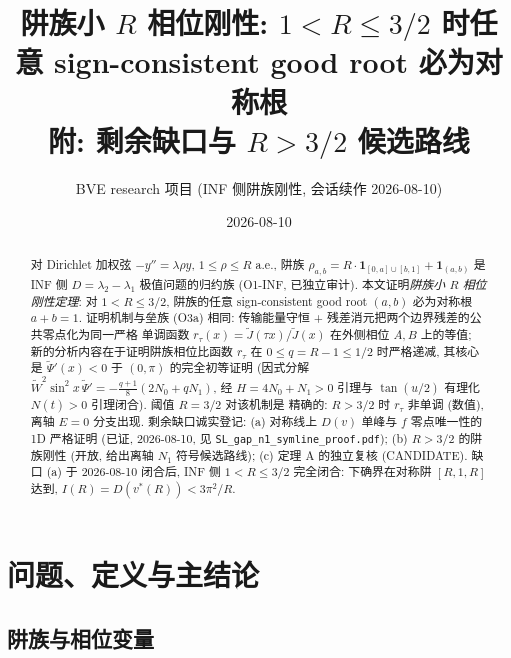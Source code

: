 \documentclass[UTF8]{ctexart}
\title{阱族小 $R$ 相位刚性: $1<R\le 3/2$ 时任意 sign-consistent good root 必为对称根\\
\large 附: 剩余缺口与 $R>3/2$ 候选路线}
\author{BVE research 项目 (INF 侧阱族刚性, 会话续作 2026-08-10)}
\date{2026-08-10}
\begin{document}
\maketitle

\begin{abstract}
对 Dirichlet 加权弦 $-y''=\lambda\rho y$, $1\le\rho\le R$ a.e., 阱族
$\rho_{a,b}=R\cdot\mathbf 1_{[0,a]\cup[b,1]}+\mathbf 1_{(a,b)}$ 是 INF 侧 $D=\lambda_2-\lambda_1$
极值问题的归约族 (O1-INF, 已独立审计). 本文证明\emph{阱族小 $R$ 相位刚性定理}:
对 $1<R\le 3/2$, 阱族的任意 sign-consistent good root $(a,b)$ 必为对称根 $a+b=1$.
证明机制与垒族 (O3a) 相同: 传输能量守恒 + 残差消元把两个边界残差的公共零点化为同一严格
单调函数 $r_{\tau}(x)=\widetilde J(\tau x)/\widetilde J(x)$ 在外侧相位 $A,B$ 上的等值;
新的分析内容在于证明阱族相位比函数 $r_{\tau}$ 在 $0\le q=R-1\le 1/2$ 时严格递减,
其核心是 $\widetilde\Psi'(x)<0$ 于 $(0,\pi)$ 的完全初等证明 (因式分解
$\widetilde W^2\sin^2x\,\widetilde\Psi'=-\frac{q+1}{8}(2N_0+qN_1)$,
经 $H=4N_0+N_1>0$ 引理与 $\tan(u/2)$ 有理化 $N(t)>0$ 引理闭合). 阈值 $R=3/2$ 对该机制是
精确的: $R>3/2$ 时 $r_{\tau}$ 非单调 (数值), 离轴 $E=0$ 分支出现. 剩余缺口诚实登记:
(a) 对称线上 $D(v)$ 单峰与 $f$ 零点唯一性的 1D 严格证明 (已证, 2026-08-10, 见 \texttt{SL\_gap\_n1\_symline\_proof.pdf}); (b) $R>3/2$ 的阱族刚性
(开放, 给出离轴 $N_1$ 符号候选路线); (c) 定理 A 的独立复核 (CANDIDATE). 缺口 (a) 于 2026-08-10 闭合后, INF 侧 $1<R\le3/2$ 完全闭合: 下确界在对称阱 $[R,1,R]$ 达到, $I(R)=D(v^*(R))<3\pi^2/R$.
\end{abstract}

\tableofcontents

\section{问题、定义与主结论}

\subsection{阱族与相位变量}
\end{document}
